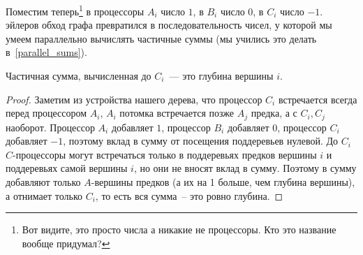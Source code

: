 Поместим теперь\footnote{Вот видите, это просто числа а никакие не процессоры. Кто это название вообще придумал?} в процессоры $A_i$ число $1$, в $B_i$ число $0$, в $C_i$ число $-1$. эйлеров обход графа превратился в последовательность чисел, у которой мы умеем параллельно вычислять частичные суммы (мы учились это делать в~\ref{parallel_sums}).
\begin{theorem*}
	Частичная сумма, вычисленная до $C_i$~--- это глубина вершины $i$.
\end{theorem*}
\begin{proof}
	Заметим из устройства нашего дерева, что процессор $C_i$ встречается всегда перед процессором $A_i$, $A_i$ потомка встречается позже $A_j$ предка, а с $C_i,C_j$ наоборот. Процессор $A_i$ добавляет $1$, процессор $B_i$ добавляет $0$, процессор $C_i$ добавляет $-1$, поэтому вклад в сумму от посещения поддеревьев нулевой. До $C_i$ $C$-процессоры могут встречаться только в поддеревьях предков вершины $i$ и поддеревьях самой вершины $i$, но они не вносят вклад в сумму. Поэтому в сумму добавляют только $A$-вершины предков (а их на 1 больше, чем глубина вершины), а отнимает только $C_i$, то есть вся сумма~-- это ровно глубина.
\end{proof}